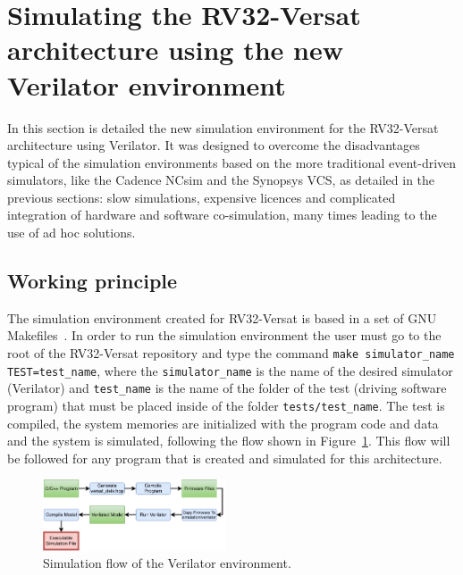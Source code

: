\documentclass[conference]{IEEEtran}
\begin{document}

\section{Simulating the RV32-Versat architecture using the new Verilator environment}
\label{chapter:sim_verilator}

In this section is detailed the new simulation environment for the RV32-Versat 
architecture using Verilator. It was designed to overcome the disadvantages typical of 
the simulation environments based on the more traditional event-driven simulators, like 
the Cadence NCsim and the Synopsys VCS, as detailed in the previous sections: slow 
simulations, expensive licences and complicated integration of hardware and software 
co-simulation, many times leading to the use of ad hoc solutions.

\subsection{Working principle}
\label{section:working_principle}

The simulation environment created for RV32-Versat is based in a set of GNU
Makefiles~\cite{stallman:makefile}. In order to run the simulation environment
the user must go to the root of the RV32-Versat repository and type the command
{\tt make simulator\_name TEST=test\_name}, where the {\tt simulator\_name} is
the name of the desired simulator (Verilator) and {\tt test\_name} is the name
of the folder of the test (driving software program) that must be placed inside
of the folder {\tt tests/test\_name}. The test is compiled, the system memories
are initialized with the program code and data and the system is simulated, following the 
flow shown in Figure~\ref{fig:sim_flow}. This flow will be followed for any program that 
is created and simulated for this architecture.

\begin{figure}[!htb]
	\centering
	\includegraphics[width=0.48\textwidth]{Figures/Sim_flow.pdf}
	\caption{Simulation flow of the Verilator environment.}
	\label{fig:sim_flow}
\end{figure}
\end{document}

